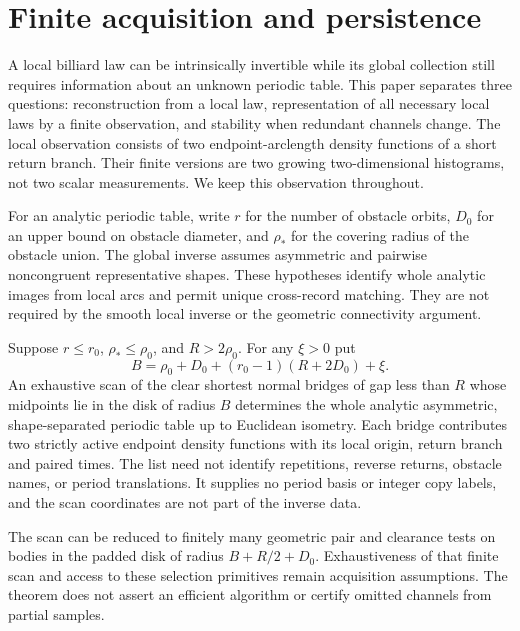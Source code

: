 \section{Finite acquisition and persistence}\label{sec:new-results}
A local billiard law can be intrinsically invertible while its global
collection still requires information about an unknown periodic table.
This paper separates three questions: reconstruction from a local law,
representation of all necessary local laws by a finite observation,
and stability when redundant channels change. The local observation
consists of two endpoint-arclength density functions of a short return
branch. Their finite versions are two growing two-dimensional histograms,
not two scalar measurements. We keep this observation throughout.

For an analytic periodic table, write $r$ for the number of obstacle
orbits, $D_0$ for an upper bound on obstacle diameter, and $\rho_*$
for the covering radius of the obstacle union. The global inverse assumes
asymmetric and pairwise noncongruent representative shapes. These
hypotheses identify whole analytic images from local arcs and permit
unique cross-record matching. They are not required by the smooth local
inverse or the geometric connectivity argument.

\begin{theorem}\label{thm:aperture-main}
Suppose $r\le r_0$, $\rho_*\le\rho_0$, and $R>2\rho_0$.
For any $\xi>0$ put
\[
 B=\rho_0+D_0+(r_0-1)(R+2D_0)+\xi.
\]
An exhaustive scan of the clear shortest normal bridges of gap less than
$R$ whose midpoints lie in the disk of radius $B$ determines the whole
analytic asymmetric, shape-separated periodic table up to Euclidean
isometry. Each bridge contributes two strictly active endpoint density
functions with its local origin, return branch and paired times.
The list need not identify repetitions, reverse returns, obstacle names,
or period translations. It supplies no period basis or integer copy
labels, and the scan coordinates are not part of the inverse data.

The scan can be reduced to finitely many geometric pair and clearance
tests on bodies in the padded disk of radius $B+R/2+D_0$.
Exhaustiveness of that finite scan and access to these selection
primitives remain acquisition assumptions. The theorem does not assert
an efficient algorithm or certify omitted channels from partial samples.
\end{theorem}

